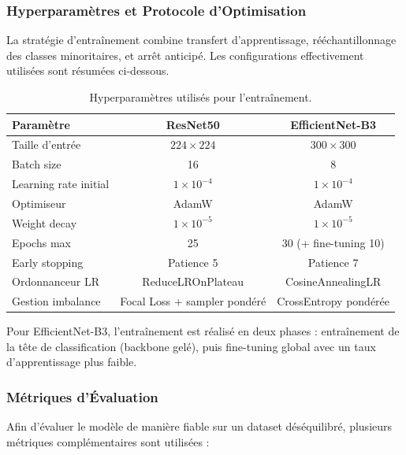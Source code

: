 \documentclass[12pt,a4paper,oneside]{report}
\begin{document}
\subsubsection{Hyperparamètres et Protocole d'Optimisation}

La stratégie d'entraînement combine transfert d'apprentissage,
rééchantillonnage des classes minoritaires, et arrêt anticipé. Les
configurations effectivement utilisées sont résumées ci-dessous.

\begin{table}[H]
\centering
\caption{Hyperparamètres utilisés pour l'entraînement.}
\label{tab:choix_hyperparametres_ch2}
\begin{tabular}{|l|c|c|}
\hline
\textbf{Paramètre} & \textbf{ResNet50} & \textbf{EfficientNet-B3} \\
\hline
Taille d'entrée & $224 \times 224$ & $300 \times 300$ \\
\hline
Batch size & 16 & 8 \\
\hline
Learning rate initial & $1\times10^{-4}$ & $1\times10^{-4}$ \\
\hline
Optimiseur & AdamW & AdamW \\
\hline
Weight decay & $1\times10^{-5}$ & $1\times10^{-5}$ \\
\hline
Epochs max & 25 & 30 (+ fine-tuning 10) \\
\hline
Early stopping & Patience 5 & Patience 7 \\
\hline
Ordonnanceur LR & ReduceLROnPlateau & CosineAnnealingLR \\
\hline
Gestion imbalance & Focal Loss + sampler pondéré & CrossEntropy pondérée \\
\hline
\end{tabular}
\end{table}

Pour EfficientNet-B3, l'entraînement est réalisé en deux phases :
entraînement de la tête de classification (backbone gelé), puis
fine-tuning global avec un taux d'apprentissage plus faible.

\subsubsection{Métriques d'Évaluation}

Afin d'évaluer le modèle de manière fiable sur un dataset déséquilibré,
plusieurs métriques complémentaires sont utilisées :
\end{document}
